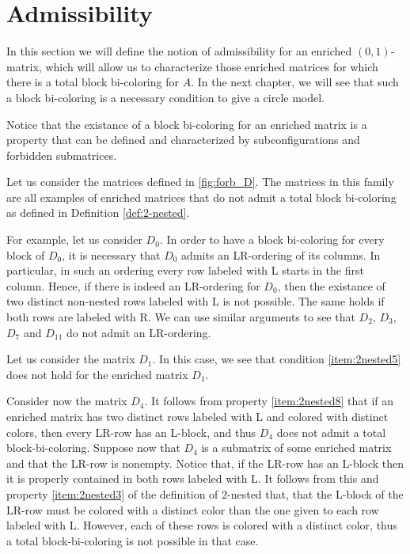 \documentclass[12pt]{book}
\theoremstyle{plain}
\theoremstyle{remark}
\begin{document}
\section{Admissibility} \label{section:admissibility}

In this section we will define the notion of admissibility for an enriched $(0,1)$-matrix, which will allow us to characterize those enriched matrices for which there is a total block bi-coloring for $A$. In the next chapter, we will see that such a block bi-coloring is a necessary condition to give a circle model.

Notice that the existance of a block bi-coloring for an enriched matrix is a property that can be defined and characterized by subconfigurations and forbidden submatrices. 

Let us consider the matrices defined in \ref{fig:forb_D}. The matrices in this family are all examples of enriched matrices that do not admit a total block bi-coloring as defined in Definition \ref{def:2-nested}.
 
For example, let us consider $D_0$. In order to have a block bi-coloring for every block of $D_0$, it is necessary that $D_0$ admits an LR-ordering of its columns. In particular, in such an ordering every row labeled with L starts in the first column. Hence, if there is indeed an LR-ordering for $D_0$, then the existance of two distinct non-nested rows labeled with L is not possible. The same holds if both rows are labeled with R.
We can use similar arguments to see that $D_2$, $D_3$, $D_7$ and $D_{11}$ do not admit an LR-ordering. 

Let us consider the matrix $D_1$. In this case, we see that condition \ref{item:2nested5} does not hold for the enriched matrix $D_1$.

Consider now the matrix $D_4$. It follows from property \ref{item:2nested8} that if an enriched matrix has two distinct rows labeled with L and colored with distinct colors, then every LR-row has an L-block, and thus $D_4$ does not admit a total block-bi-coloring.
Suppose now that $D_4$ is a submatrix of some enriched matrix and that the LR-row is nonempty. Notice that, if the LR-row has an L-block then it is properly contained in both rows labeled with L. It follows from this and property \ref{item:2nested3} of the definition of $2$-nested that, that the L-block of the LR-row must be colored with a distinct color than the one given to each row labeled with L. However, each of these rows is colored with a distinct color, thus a total block-bi-coloring is not possible in that case. 
\end{document}
